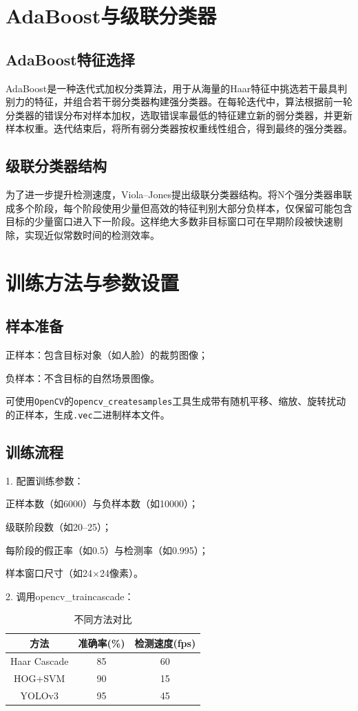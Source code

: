 \documentclass[UTF8]{ctexart}
\begin{document}
\section{AdaBoost与级联分类器}
\subsection{AdaBoost特征选择}
AdaBoost是一种迭代式加权分类算法，用于从海量的Haar特征中挑选若干最具判别力的特征，并组合若干弱分类器构建强分类器。在每轮迭代中，算法根据前一轮分类器的错误分布对样本加权，选取错误率最低的特征建立新的弱分类器，并更新样本权重。迭代结束后，将所有弱分类器按权重线性组合，得到最终的强分类器。

\subsection{级联分类器结构}
为了进一步提升检测速度，Viola–Jones提出级联分类器结构。将N个强分类器串联成多个阶段，每个阶段使用少量但高效的特征判别大部分负样本，仅保留可能包含目标的少量窗口进入下一阶段。这样绝大多数非目标窗口可在早期阶段被快速剔除，实现近似常数时间的检测效率。

\section{训练方法与参数设置}
\subsection{样本准备}
正样本：包含目标对象（如人脸）的裁剪图像；

负样本：不含目标的自然场景图像。

可使用\texttt{OpenCV}的\texttt{opencv\_createsamples}工具生成带有随机平移、缩放、旋转扰动的正样本，生成\texttt{.vec}二进制样本文件。

\subsection{训练流程}
1.	配置训练参数：

正样本数（如6000）与负样本数（如10000）；

级联阶段数（如20–25）；

每阶段的假正率（如0.5）与检测率（如0.995）；

样本窗口尺寸（如24×24像素）。

2.	调用opencv\_traincascade：
\begin{table}[htbp]
\centering
\caption{不同方法对比}
\begin{tabular}{|c|c|c|}
\hline
方法 & 准确率(\%) & 检测速度(fps) \\
\hline
Haar Cascade & 85 & 60 \\
HOG+SVM & 90 & 15 \\
YOLOv3 & 95 & 45 \\
\hline
\end{tabular}
\end{table}
\end{document}
